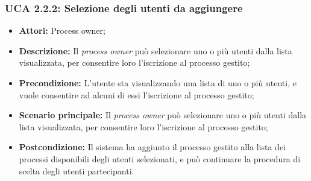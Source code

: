 \hypertarget{A2.2.2}{}
\subsubsection{UCA 2.2.2: Selezione degli utenti da aggiungere}
\begin{itemize}
\item \textbf{Attori:} Process owner;
\item \textbf{Descrizione:}
Il \textit{process owner} può selezionare uno o più utenti dalla lista visualizzata, per consentire loro l'iscrizione al processo gestito;
\item \textbf{Precondizione:}
L'utente sta visualizzando una lista di uno o più utenti, e vuole consentire ad alcuni di essi l'iscrizione al processo gestito;
\item \textbf{Scenario principale:}
Il \textit{process owner} può selezionare uno o più utenti dalla lista visualizzata, per consentire loro l'iscrizione al processo gestito;
\item \textbf{Postcondizione:}
Il sistema ha aggiunto il processo gestito alla lista dei processi disponibili degli utenti selezionati, e può continuare la procedura di scelta degli utenti partecipanti.
\end{itemize}

\hypertarget{A2.3}{}
